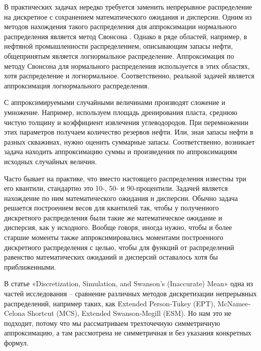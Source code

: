 \documentclass[specialist, substylefile = spbu.rtx,
subf,href,colorlinks=true, 12pt]{disser}
\begin{document}
	
	\pagebreak
	\tableofcontents
	
	
	\pagebreak
	
	\intro
	
	В практических задачах нередко требуется заменить непрерывное распределение на
	дискретное с сохранением математического ожидания и дисперсии. Одним из методов
	нахождения такого распределения для аппроксимации нормального распределения является метод Свонсона \cite{Swansong}. Однако в ряде областей, например, в нефтяной промышленности распределением, описывающим запасы нефти, общепринятым является логнормальное распределение. Аппроксимация по методу Свонсона для нормального распределения используется в этих областях, хотя распределение и логнормальное. Соответственно, реальной задачей является аппроксимация логнормального распределения.
	
	С аппроксимируемыми случайными величинами производят сложение и умножение.
	Например, используем площадь дренирования пласта, среднюю чистую толщину и коэффициент извлечения углеводородов. При перемножении этих параметров получаем количество резервов нефти. Или, зная запасы нефти в разных скважинах, нужно оценить суммарные запасы.
	Соответственно, возникает задача находить аппроксимацию суммы и произведения по аппроксимациям исходных случайных величин.
	
	Часто бывает на практике, что вместо настоящего распределения известны три его квантили, стандартно это 10-, 50- и 90-процентили. Задачей является нахождение по ним математического ожидания и дисперсии. Обычно задача решается построением весов для квантилей так, чтобы у полученного дискретного распределения были такие же математическое ожидание и дисперсия, как у исходного. Вообще говоря, иногда нужно, чтобы и более старшие моменты также аппроксимировались моментами построенного дискретного распределения с целью, чтобы для функций от распределений равенство математических ожиданий и дисперсий оставалось хотя бы приближенными.
	
	В статье «Discretization, Simulation, and Swanson's (Inaccurate) Mean» \cite{Discretization} одна из частей исследования -- сравнение различных методов дискретизации непрерывных распределений, например таких, как Extended Person‐Tukey (EPT), McNamee‐Celona Shortcut (MCS), Extended Swanson‐Megill (ESM). Но нам это не подходит, потому что мы рассматриваем трехточечную симметричную аппроксимацию, а там рассмотрена не симметричная и без указания конкретных формул.
	
\end{document}
